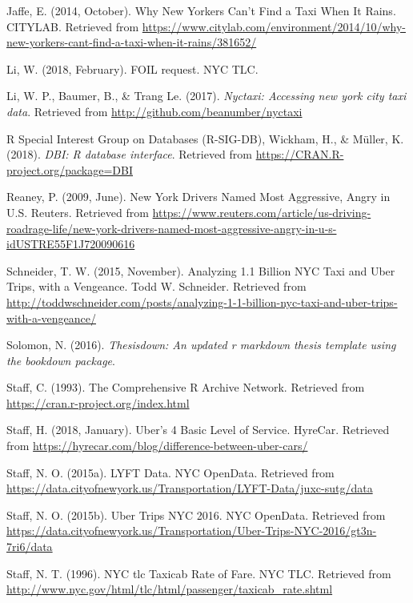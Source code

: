 \documentclass[12pt,twoside]{reedthesis}
\theoremstyle{definition}
\theoremstyle{definition}
\theoremstyle{definition}
\theoremstyle{remark}
\begin{document}
\hypertarget{ref-citylab}{}
Jaffe, E. (2014, October). Why New Yorkers Can't Find a Taxi When It
Rains. CITYLAB. Retrieved from
\url{https://www.citylab.com/environment/2014/10/why-new-yorkers-cant-find-a-taxi-when-it-rains/381652/}

\hypertarget{ref-foirequest}{}
Li, W. (2018, February). FOIL request. NYC TLC.

\hypertarget{ref-pkgnyctaxi}{}
Li, W. P., Baumer, B., \& Trang Le. (2017). \emph{Nyctaxi: Accessing new
york city taxi data}. Retrieved from
\url{http://github.com/beanumber/nyctaxi}

\hypertarget{ref-pkgDBI}{}
R Special Interest Group on Databases (R-SIG-DB), Wickham, H., \&
Müller, K. (2018). \emph{DBI: R database interface}. Retrieved from
\url{https://CRAN.R-project.org/package=DBI}

\hypertarget{ref-reaney2009}{}
Reaney, P. (2009, June). New York Drivers Named Most Aggressive, Angry
in U.S. Reuters. Retrieved from
\url{https://www.reuters.com/article/us-driving-roadrage-life/new-york-drivers-named-most-aggressive-angry-in-u-s-idUSTRE55F1J720090616}

\hypertarget{ref-schneider2015}{}
Schneider, T. W. (2015, November). Analyzing 1.1 Billion NYC Taxi and
Uber Trips, with a Vengeance. Todd W. Schneider. Retrieved from
\url{http://toddwschneider.com/posts/analyzing-1-1-billion-nyc-taxi-and-uber-trips-with-a-vengeance/}

\hypertarget{ref-pkgthesisdown}{}
Solomon, N. (2016). \emph{Thesisdown: An updated r markdown thesis
template using the bookdown package}.

\hypertarget{ref-cran}{}
Staff, C. (1993). The Comprehensive R Archive Network. Retrieved from
\url{https://cran.r-project.org/index.html}

\hypertarget{ref-uberx}{}
Staff, H. (2018, January). Uber's 4 Basic Level of Service. HyreCar.
Retrieved from
\url{https://hyrecar.com/blog/difference-between-uber-cars/}

\hypertarget{ref-datalyft}{}
Staff, N. O. (2015a). LYFT Data. NYC OpenData. Retrieved from
\url{https://data.cityofnewyork.us/Transportation/LYFT-Data/juxc-sutg/data}

\hypertarget{ref-datauberweek}{}
Staff, N. O. (2015b). Uber Trips NYC 2016. NYC OpenData. Retrieved from
\url{https://data.cityofnewyork.us/Transportation/Uber-Trips-NYC-2016/gt3n-7ri6/data}

\hypertarget{ref-tlcfarerate}{}
Staff, N. T. (1996). NYC tlc Taxicab Rate of Fare. NYC TLC. Retrieved
from \url{http://www.nyc.gov/html/tlc/html/passenger/taxicab_rate.shtml}
\end{document}

